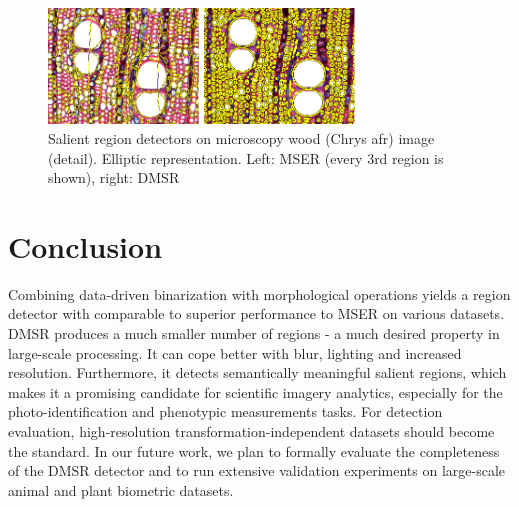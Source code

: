 \documentclass[conference,compsoc]{IEEEtran}
\begin{document}
\begin{figure}[htb]
\begin{minipage}[b]{.49\linewidth}
  \centering
  \centerline{\includegraphics[width=4cm]{mser_wood_C}}
\end{minipage}
\hfill
\begin{minipage}[b]{0.49\linewidth}
  \centering
  \centerline{\includegraphics[width=4cm]{dmsr_wood_C}}
\end{minipage}
\vspace{-0.25cm}
\caption{Salient region detectors on microscopy wood (Chrys afr) image (detail). Elliptic representation. Left: MSER (every $3$rd region is shown), right: DMSR}
\label{fig:wood_C}

\end{figure}

\section{Conclusion}

Combining data-driven binarization with morphological operations yields a region detector with comparable to superior performance to MSER on various datasets. DMSR produces a much smaller number of regions - a much desired property in large-scale processing. It can cope better with blur, lighting and increased resolution. Furthermore, it detects semantically meaningful salient regions, which makes it a promising candidate for scientific imagery analytics, especially for the photo-identification and phenotypic measurements tasks. For detection evaluation, high-resolution transformation-independent datasets should become the standard. In our future work, we plan to formally evaluate the completeness of the DMSR detector and to run extensive validation experiments on large-scale animal and plant biometric datasets.
\end{document}
